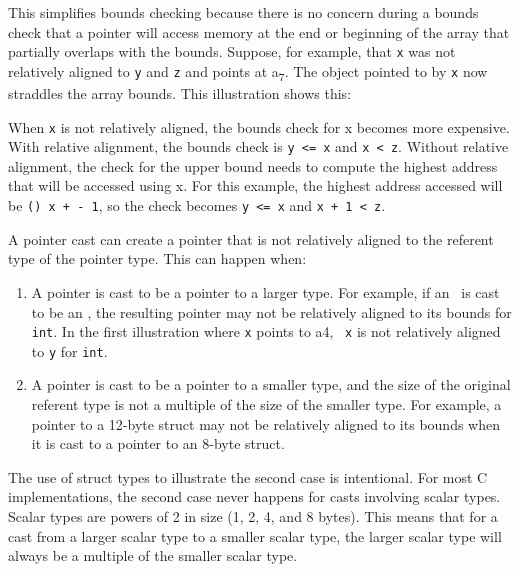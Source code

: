 This simplifies bounds checking because there is no concern during a
bounds check that a pointer will access memory at the end or beginning
of the array that partially overlaps with the bounds. Suppose, for
example, that \texttt{x} was not relatively aligned to \texttt{y} and
\texttt{z} and points at a\textsubscript{7}. The object pointed to by
\texttt{x} now straddles the array bounds. This illustration shows this:
\begin{center}
\end{center}

When \texttt{x} is not relatively aligned, the bounds check for x
becomes more expensive. With relative alignment, the bounds check is
\texttt{y <= x} and \texttt{x < z}. Without relative
alignment, the check for the upper bound needs to compute the highest
address that will be accessed using x. For this example, the highest
address accessed will be
\texttt{(\arrayptrchar) x +  - 1}, so the check becomes 
\texttt{y <= x} and \texttt{x + 1 < z}.

A pointer cast can create a pointer that is not relatively aligned to
the referent type of the pointer type. This can happen when:

\begin{enumerate}
\item
  A pointer is cast to be a pointer to a larger type. For example, if an
  \ is cast to be an
  \arrayptrint , the resulting pointer
  may not be relatively aligned to its bounds for \texttt{int}. In the
  first illustration where \texttt{x} points to a4,
  \arrayptrint\ \texttt{x} is not relatively
  aligned to \texttt{y} for \texttt{int}.
\item
  A pointer is cast to be a pointer to a smaller type, and the size of
  the original referent type is not a multiple of the size of the
  smaller type. For example, a pointer to a 12-byte struct may not be
  relatively aligned to its bounds when it is cast to a pointer to an
  8-byte struct.
\end{enumerate}

The use of struct types to illustrate the second case is intentional.
For most C implementations, the second case never happens for casts
involving scalar types. Scalar types are powers of 2 in size (1, 2, 4,
and 8 bytes). This means that for a cast from a larger scalar type to a
smaller scalar type, the larger scalar type will always be a multiple of
the smaller scalar type.

